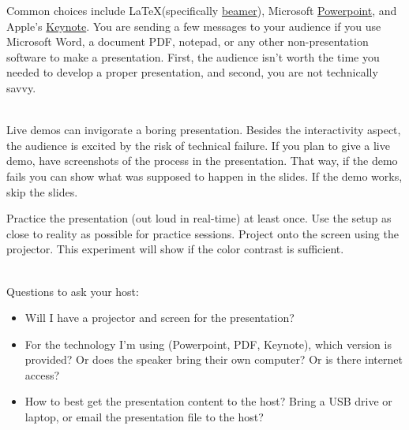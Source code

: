 Common choices include \LaTeX (specifically \href{https://en.wikipedia.org/wiki/Beamer_(LaTeX)}{beamer}), 
Microsoft \href{https://en.wikipedia.org/wiki/Microsoft_PowerPoint}{Powerpoint}, 
and Apple's \href{https://en.wikipedia.org/wiki/Keynote_(presentation_software)}{Keynote}. 
You are sending a few messages to your audience if you use Microsoft Word, a document PDF, notepad, or any other non-presentation software to make a presentation.
First, the audience isn't worth the time you needed to develop a proper presentation, and second, you are not technically savvy.

\ \\


Live demos can invigorate a boring presentation. Besides the interactivity aspect, the audience is excited by the risk of technical failure. 
If you plan to give a live demo, have screenshots of the process in the presentation. That way, if the demo fails you can show what was supposed to happen in the slides. If the demo works, skip the slides.


Practice the presentation (out loud in real-time) at least once.
Use the setup as close to reality as possible for practice sessions. Project onto the screen using the projector. This experiment will show if the color contrast is sufficient.

\ \\

Questions to ask your host:
\begin{itemize}
    \item Will I have a projector and screen for the presentation?
    \item For the technology I'm using (Powerpoint, PDF, Keynote), which version is provided? 
    Or does the speaker bring their own computer? 
    Or is there internet access?
    \item How to best get the presentation content to the host? Bring a USB drive or laptop, or email the presentation file to the host?
\end{itemize}


